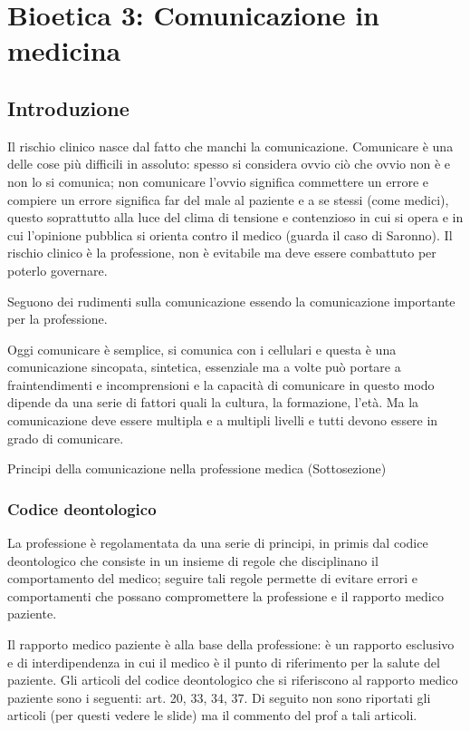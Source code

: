 \section{Bioetica 3: Comunicazione in medicina}

\subsection{Introduzione}

Il rischio clinico nasce dal fatto che manchi la comunicazione.
Comunicare è una delle cose più difficili in assoluto: spesso si
considera ovvio ciò che ovvio non è e non lo si comunica; non comunicare
l'ovvio significa commettere un errore e compiere un errore significa
far del male al paziente e a se stessi (come medici), questo soprattutto
alla luce del clima di tensione e contenzioso in cui si opera e in cui
l'opinione pubblica si orienta contro il medico (guarda il caso di
Saronno). Il rischio clinico è la professione, non è evitabile ma deve
essere combattuto per poterlo governare.

Seguono dei rudimenti sulla comunicazione essendo la comunicazione
importante per la professione.

Oggi comunicare è semplice, si comunica con i cellulari e questa è una
comunicazione sincopata, sintetica, essenziale ma a volte può portare a
fraintendimenti e incomprensioni e la capacità di comunicare in questo
modo dipende da una serie di fattori quali la cultura, la formazione,
l'età. Ma la comunicazione deve essere multipla e a multipli livelli e
tutti devono essere in grado di comunicare.

Principi della comunicazione nella professione medica (Sottosezione)

\subsubsection{Codice deontologico}

La professione è regolamentata da una serie di principi, in primis dal
codice deontologico che consiste in un insieme di regole che
disciplinano il comportamento del medico; seguire tali regole permette
di evitare errori e comportamenti che possano compromettere la
professione e il rapporto medico paziente.

Il rapporto medico paziente è alla base della professione: è un rapporto
esclusivo e di interdipendenza in cui il medico è il punto di
riferimento per la salute del paziente. Gli articoli del codice
deontologico che si riferiscono al rapporto medico paziente sono i
seguenti: art. 20, 33, 34, 37. Di seguito non sono riportati gli
articoli (per questi vedere le slide) ma il commento del prof a tali
articoli.

